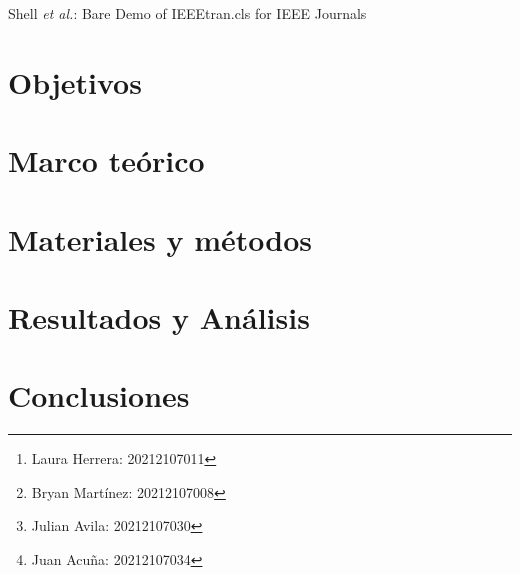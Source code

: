\documentclass[journal, table]{IEEEtran}
\begin{document}
\title{}

\author[*]{Laura Herrera
    \thanks{Laura Herrera: 20212107011}}
\author[*]{Bryan Martínez
    \thanks{Bryan Martínez: 20212107008}}
\author[*]{Julian Avila
    \thanks{Julian Avila: 20212107030}}
\author[*]{Juan Acuña
    \thanks{Juan Acuña: 20212107034}}



\markboth{}
{Shell \MakeLowercase{\textit{et al.}}: Bare Demo of IEEEtran.cls for IEEE Journals}

\maketitle



\section{Objetivos}


\section{Marco teórico}


\section{Materiales y métodos}


\section{Resultados y Análisis}


\section{Conclusiones}


\printbibliography
\end{document}
